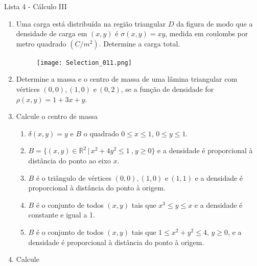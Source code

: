 \documentclass[11pt,a4paper]{article}
\begin{document}
	\begin{center}
		\Large Lista 4 - Cálculo III
	\end{center}
	

	\begin{enumerate}
	
	\item Uma carga está distribuída na região triangular $D$ da figura de modo que a densidade de carga em $(x,y)$ é $\sigma (x,y) = xy$, medida em coulombs por metro quadrado $(C/m^2)$. Determine a carga total.

\begin{figure}[h]	
\centering %
\texttt{[image: Selection\_011.png]} %
\end{figure}

\item Determine a massa e o centro de massa de uma lâmina triangular com vértices $(0,0),(1,0) \textrm{ e}\ (0,2)$, se a função de densidade for $\rho (x,y) = 1 + 3x + y$.

\item Calcule o centro de massa

\begin{enumerate}
\item $\delta (x,y) = y$ e $B$ o quadrado $0 \leq x \leq 1$, $0 \leq y \leq 1$.
\item $B = \{(x,y) \in \mathbb{R}^2 \,|\, x^2 + 4y^2 \leq 1\ \textrm{,}\ y \geq 0\}$ e a densidade é proporcional à distância do ponto ao eixo $x$.
\item $B$ é o triângulo de vértices $(0,0),(1,0) \textrm{ e}\ (1,1)$ e a densidade é proporcional à distância do ponto à origem.
\item $B$ é o conjunto de todos $(x,y)$ tais que $x^3 \leq y \leq x$ e a densidade é constante e igual a 1.
\item $B$ é o conjunto de todos $(x,y)$ tais que $1 \leq x^2 + y^2 \leq 4$, $y \geq 0$, e a densidade é proporcional à distância do ponto à origem.
\end{enumerate}

\item Calcule


\end{enumerate}
\end{document}
